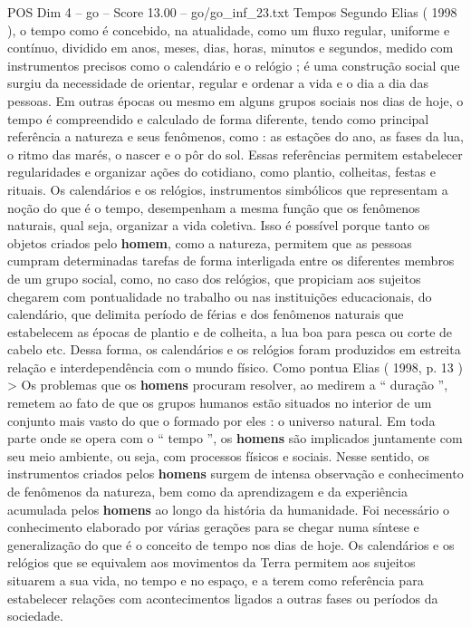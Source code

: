 \begin{textsample}{POS Dim 4 – go – Score 13.00 – go/go\_inf\_23.txt}
Tempos Segundo Elias ( 1998 ), o tempo como é concebido, na atualidade, como um fluxo regular, uniforme e contínuo, dividido em anos, meses, dias, horas, minutos e segundos, medido com instrumentos precisos como o calendário e o relógio ; é uma construção social que surgiu da necessidade de orientar, regular e ordenar a vida e o dia a dia das pessoas.
Em outras épocas ou mesmo em alguns grupos sociais nos dias de hoje, o tempo é compreendido e calculado de forma diferente, tendo como principal referência a natureza e seus fenômenos, como : as estações do ano, as fases da lua, o ritmo das marés, o nascer e o pôr do sol.
Essas referências permitem estabelecer regularidades e organizar ações do cotidiano, como plantio, colheitas, festas e rituais.
Os calendários e os relógios, instrumentos simbólicos que representam a noção do que é o tempo, desempenham a mesma função que os fenômenos naturais, qual seja, organizar a vida coletiva.
Isso é possível porque tanto os objetos criados pelo \textbf{homem}, como a natureza, permitem que as pessoas cumpram determinadas tarefas de forma interligada entre os diferentes membros de um grupo social, como, no caso dos relógios, que propiciam aos sujeitos chegarem com pontualidade no trabalho ou nas instituições educacionais, do calendário, que delimita período de férias e dos fenômenos naturais que estabelecem as épocas de plantio e de colheita, a lua boa para pesca ou corte de cabelo etc.
Dessa forma, os calendários e os relógios foram produzidos em estreita relação e interdependência com o mundo físico.
Como pontua Elias ( 1998, p. 13 ) > Os problemas que os \textbf{homens} procuram resolver, ao medirem a “ duração ”, remetem ao fato de que os grupos humanos estão situados no interior de um conjunto mais vasto do que o formado por eles : o universo natural.
Em toda parte onde se opera com o “ tempo ”, os \textbf{homens} são implicados juntamente com seu meio ambiente, ou seja, com processos físicos e sociais.
Nesse sentido, os instrumentos criados pelos \textbf{homens} surgem de intensa observação e conhecimento de fenômenos da natureza, bem como da aprendizagem e da experiência acumulada pelos \textbf{homens} ao longo da história da humanidade.
Foi necessário o conhecimento elaborado por várias gerações para se chegar numa síntese e generalização do que é o conceito de tempo nos dias de hoje.
Os calendários e os relógios que se equivalem aos movimentos da Terra permitem aos sujeitos situarem a sua vida, no tempo e no espaço, e a terem como referência para estabelecer relações com acontecimentos ligados a outras fases ou períodos da sociedade.

\end{textsample}
